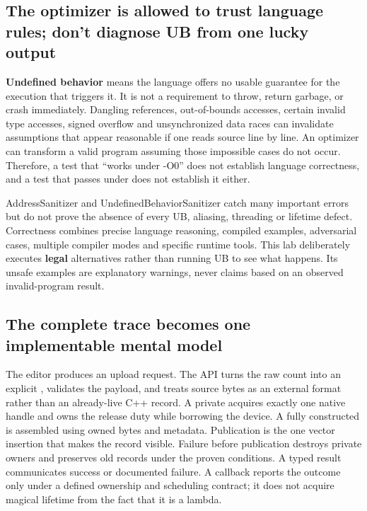 \subsection{The optimizer is allowed to trust language rules; don't diagnose UB from one lucky output}\label{05-engine-i-ch004-the-optimizer-is-allowed-to-trust-language-rules-dont-diagnose-ub-from-one-lucky-output}

\hypertarget{05-engine-i-ch004-the-optimizer-is-allowed-to-trust-language-rules-dont-diagnose-ub-from-one-lucky-output}{}

\textbf{Undefined behavior} means the language offers no usable guarantee for the execution that triggers it. It is not a requirement to throw, return garbage, or crash immediately. Dangling references, out-of-bounds accesses, certain invalid type accesses, signed overflow and unsynchronized data races can invalidate assumptions that appear reasonable if one reads source line by line. An optimizer can transform a valid program assuming those impossible cases do not occur. Therefore, a test that ``works under -O0'' does not establish language correctness, and a test that passes under  does not establish it either.

AddressSanitizer and UndefinedBehaviorSanitizer catch many important errors but do not prove the absence of every UB, aliasing, threading or lifetime defect. Correctness combines precise language reasoning, compiled examples, adversarial cases, multiple compiler modes and specific runtime tools. This lab deliberately executes \textbf{legal} alternatives rather than running UB to see what happens. Its unsafe examples are explanatory warnings, never claims based on an observed invalid-program result.

\subsection{The complete trace becomes one implementable mental model}\label{05-engine-i-ch004-the-complete-trace-becomes-one-implementable-mental-model}

\hypertarget{05-engine-i-ch004-the-complete-trace-becomes-one-implementable-mental-model}{}

The editor produces an upload request. The API turns the raw count into an explicit , validates the payload, and treats source bytes as an external format rather than an already-live C++ record. A private  acquires exactly one native handle and owns the release duty while borrowing the device. A fully constructed  is assembled using owned bytes and metadata. Publication is the one vector insertion that makes the record visible. Failure before publication destroys private owners and preserves old records under the proven conditions. A typed result communicates success or documented failure. A callback reports the outcome only under a defined ownership and scheduling contract; it does not acquire magical lifetime from the fact that it is a lambda.


